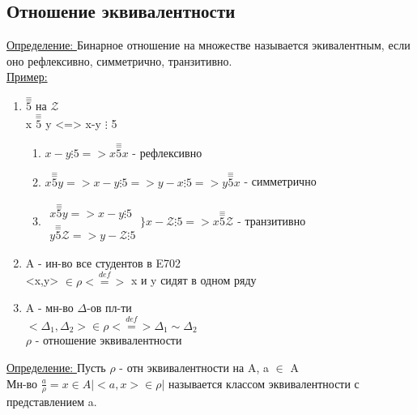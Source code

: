 \documentclass[12pt]{article}
\begin{document}
    \subsection{Отношение эквивалентности}
    \underline{Определение: }Бинарное отношение на множестве называется экивалентным, если оно 
    рефлексивно, симметрично, транзитивно.\\
    \underline{Пример:}\\
    \begin{enumerate}
        \item $\overset{\equiv}{5}$ на $\mathcal{Z}$\\
        x $\overset{\equiv}{5}$ y <=> x-y $\vdots$ 5\\
        \begin{enumerate}
            \item $x-y \vdots 5 => x \overset{\equiv}{5} x$ - рефлексивно
            \item $x \overset{\equiv}{5} y => x-y \vdots 5 => y-x \vdots 5 => y \overset{\equiv}{5}
            x $ - симметрично
            \item $\begin{matrix}
                x \overset{\equiv}{5} y => x-y \vdots 5\\
                y \overset{\equiv}{5} \mathcal{Z} => y - \mathcal{Z} \vdots 5
                \end{matrix} \Bigg\} x-\mathcal{Z} \vdots 5 => x \overset{\equiv}{5} \mathcal{Z}$ - транзитивно 
        \end{enumerate}
        \item A - ин-во все студентов в E702\\
        <x,y> $\in \rho \overset{def}{<=>}$ x и y сидят в одном ряду
        \item A - мн-во $\Delta $-ов пл-ти\\
        $<\Delta_1,\Delta_2> \in \rho \overset{def}{<=>} \Delta_1 \sim  \Delta_2$\\
        $\rho$ - отношение эквивалентности
    \end{enumerate}
    \underline{Определение: } Пусть $\rho$ - отн эквивалентности на A, a $\in$ A\\
    Мн-во $\frac{a}{\rho}=x \in A \Big|<a,x> \in \rho \Big| $ называется классом эквивалентности
    с представлением a.
\end{document}
